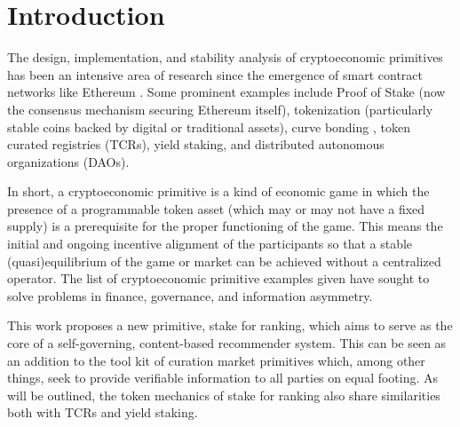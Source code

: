 \section{Introduction}

The design, implementation, and stability analysis of cryptoeconomic primitives \cite{horne2018crypto} has been an intensive area of research since the emergence of smart contract networks like Ethereum \cite{buterin2014next}. Some prominent examples include Proof of Stake \cite{quantum2011bitcoin} (now the consensus mechanism securing Ethereum itself), tokenization (particularly stable coins backed by digital or traditional assets), curve bonding \cite{graphBondingCurve}, token curated registries \cite{Goldin2018TCR} (TCRs), yield staking, and distributed autonomous organizations \cite{merkle2016daos} (DAOs). 

In short, a cryptoeconomic primitive is a kind of economic game in which the presence of a programmable token asset (which may or may not have a fixed supply) is a prerequisite for the proper functioning of the game. This means the initial and ongoing incentive alignment of the participants so that a stable (quasi)equilibrium of the game or market can be achieved without a centralized operator. The list of cryptoeconomic primitive examples given have sought to solve problems in finance, governance, and information asymmetry. 

This work proposes a new primitive, stake for ranking, which aims to serve as the core of a self-governing, content-based recommender system. This can be seen as an addition to the tool kit of curation market primitives which, among other things, seek to provide verifiable information to all parties on equal footing. As will be outlined, the token mechanics of stake for ranking also share similarities both with TCRs and yield staking. 
